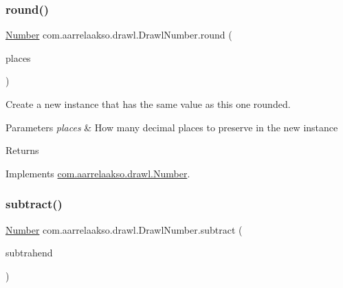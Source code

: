 \mbox{\label{classcom_1_1aarrelaakso_1_1drawl_1_1_drawl_number_a9755cb62f7e9df1377379aa6781b8de0}} 
\subsubsection{\texorpdfstring{round()}{round()}\hspace{0.1cm}{\footnotesize\ttfamily [2/2]}}
{\footnotesize\ttfamily \hyperlink{interfacecom_1_1aarrelaakso_1_1drawl_1_1_number}{Number} com.\+aarrelaakso.\+drawl.\+Drawl\+Number.\+round (\begin{DoxyParamCaption}\item[{final int}]{places }\end{DoxyParamCaption})}



Create a new instance that has the same value as this one rounded. 


\begin{DoxyParams}{Parameters}
{\em places} & How many decimal places to preserve in the new instance \\
\hline
\end{DoxyParams}
\begin{DoxyReturn}{Returns}

\end{DoxyReturn}


Implements \hyperlink{interfacecom_1_1aarrelaakso_1_1drawl_1_1_number_a0d76b3c8e56e9f18a3ce9baf42be705f}{com.\+aarrelaakso.\+drawl.\+Number}.

\mbox{\label{classcom_1_1aarrelaakso_1_1drawl_1_1_drawl_number_ab5072a1d6694648646b386c3f7e65b0e}} 
\subsubsection{\texorpdfstring{subtract()}{subtract()}\hspace{0.1cm}{\footnotesize\ttfamily [1/3]}}
{\footnotesize\ttfamily \hyperlink{interfacecom_1_1aarrelaakso_1_1drawl_1_1_number}{Number} com.\+aarrelaakso.\+drawl.\+Drawl\+Number.\+subtract (\begin{DoxyParamCaption}\item[{@Not\+Null final \hyperlink{interfacecom_1_1aarrelaakso_1_1drawl_1_1_number}{Number}}]{subtrahend }\end{DoxyParamCaption})}



